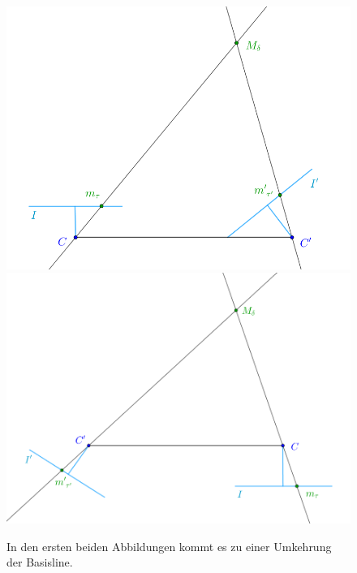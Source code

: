 \begin{figure}[!htb]
	\includegraphics[width=\linewidth]{images/P_Solution_one.png}
	\endminipage\hfill
	\includegraphics[width=\linewidth]{images/P_Solution_two.png}
	\endminipage\hfill	
	\caption[Bestimmung extrinsischer Kameraparameter Lösung eins und zwei]{In den ersten beiden Abbildungen kommt es zu einer Umkehrung der Basisline.}
	\label{fig:T_1}
\end{figure}
